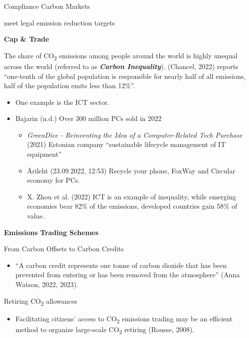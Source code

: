 \documentclass[
  letterpaper,
  DIV=11,
  numbers=noendperiod]{scrartcl}
\providecommand{\tightlist}{%
  \setlength{\itemsep}{0pt}\setlength{\parskip}{0pt}}\usepackage{longtable,booktabs,array}
\begin{document}
Compliance Carbon Markets

meet legal emission reduction targets

\textbf{Cap \& Trade}

The share of CO\textsubscript{2} emissions among people around the world
is highly unequal across the world (referred to as \textbf{\emph{Carbon
Inequality}}). (Chancel, 2022) reports ``one-tenth of the global
population is responsible for nearly half of all emissions, half of the
population emits less than 12\%''.

\begin{itemize}
\item
  One example is the ICT sector.
\item
  Bajarin (n.d.) Over 300 million PCs sold in 2022

  \begin{itemize}
  \tightlist
  \item
    \emph{{GreenDice} - {Reinventing} the Idea of a Computer-Related
    Tech Purchase} (2021) Estonian company ``sustainable lifecycle
    management of IT equipment''
  \item
    Ärileht (23.09.2022, 12:53) Recycle your phone, FoxWay and Circular
    economy for PCs.
  \item
    X. Zhou et al. (2022) ICT is an example of inequality, while
    emerging economies bear 82\% of the emissions, developed countries
    gain 58\% of value.
  \end{itemize}
\end{itemize}

\textbf{Emissions Trading Schemes}

From Carbon Offsets to Carbon Credits

\begin{itemize}
\tightlist
\item
  ``A carbon credit represents one tonne of carbon dioxide that has been
  prevented from entering or has been removed from the atmosphere''
  (Anna Watson, 2022, 2023).
\end{itemize}

Retiring CO\textsubscript{2} allowances

\begin{itemize}
\tightlist
\item
  Facilitating citizens' access to CO\textsubscript{2} emissions trading
  may be an efficient method to organize large-scale CO\textsubscript{2}
  retiring (Rousse, 2008).
\end{itemize}
\end{document}
